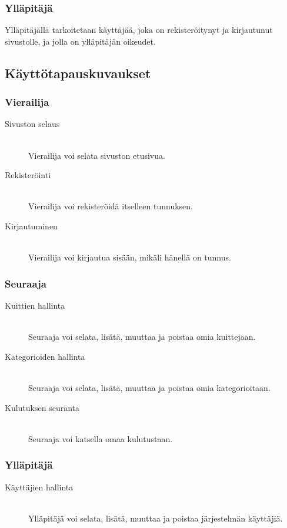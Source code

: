 \documentclass[a4paper]{article}
\begin{document}
	\subsubsection{Ylläpitäjä}
	Ylläpitäjällä tarkoitetaan käyttäjää, joka on rekisteröitynyt ja kirjautunut sivustolle, ja jolla on ylläpitäjän oikeudet.
	
	\subsection{Käyttötapauskuvaukset}
	\subsubsection{Vierailija}
	\begin{addmargin}[2em]{0em}
		\begin{description}
			\item[Sivuston selaus] \hfill \\
				Vierailija voi selata sivuston etusivua.
			\item[Rekisteröinti] \hfill \\
				Vierailija voi rekisteröidä itselleen tunnuksen.
			\item[Kirjautuminen] \hfill \\
				Vierailija voi kirjautua sisään, mikäli hänellä on tunnus.
		\end{description}
	\end{addmargin}

	
	\subsubsection{Seuraaja}
	\begin{addmargin}[2em]{0em}
		\begin{description}
			\item[Kuittien hallinta] \hfill \\
				Seuraaja voi selata, lisätä, muuttaa ja poistaa omia kuittejaan.
			\item[Kategorioiden hallinta] \hfill \\
				Seuraaja voi selata, lisätä, muuttaa ja poistaa omia kategorioitaan.
			\item[Kulutuksen seuranta] \hfill \\
				Seuraaja voi katsella omaa kulutustaan.
		\end{description}
	\end{addmargin}
	
	\subsubsection{Ylläpitäjä}
	\begin{addmargin}[2em]{0em}
		\begin{description}
			\item[Käyttäjien hallinta] \hfill \\
				Ylläpitäjä voi selata, lisätä, muuttaa ja poistaa järjestelmän käyttäjiä.
		\end{description}
	\end{addmargin}
\end{document}
